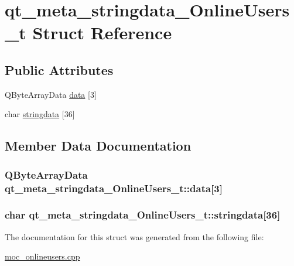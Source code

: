 \hypertarget{structqt__meta__stringdata__OnlineUsers__t}{\section{qt\-\_\-meta\-\_\-stringdata\-\_\-\-Online\-Users\-\_\-t Struct Reference}
\label{structqt__meta__stringdata__OnlineUsers__t}
}
\subsection*{Public Attributes}
\begin{DoxyCompactItemize}
\item 
Q\-Byte\-Array\-Data \hyperlink{structqt__meta__stringdata__OnlineUsers__t_a75c3ca3008c2c89b9b3f04904a9d1a8b}{data} \mbox{[}3\mbox{]}
\item 
char \hyperlink{structqt__meta__stringdata__OnlineUsers__t_aaf55f6ce0afb548da929a429678bcec9}{stringdata} \mbox{[}36\mbox{]}
\end{DoxyCompactItemize}


\subsection{Member Data Documentation}
\hypertarget{structqt__meta__stringdata__OnlineUsers__t_a75c3ca3008c2c89b9b3f04904a9d1a8b}{
\subsubsection[{data}]{\setlength{\rightskip}{0pt plus 5cm}Q\-Byte\-Array\-Data qt\-\_\-meta\-\_\-stringdata\-\_\-\-Online\-Users\-\_\-t\-::data\mbox{[}3\mbox{]}}}\label{structqt__meta__stringdata__OnlineUsers__t_a75c3ca3008c2c89b9b3f04904a9d1a8b}
\hypertarget{structqt__meta__stringdata__OnlineUsers__t_aaf55f6ce0afb548da929a429678bcec9}{
\subsubsection[{stringdata}]{\setlength{\rightskip}{0pt plus 5cm}char qt\-\_\-meta\-\_\-stringdata\-\_\-\-Online\-Users\-\_\-t\-::stringdata\mbox{[}36\mbox{]}}}\label{structqt__meta__stringdata__OnlineUsers__t_aaf55f6ce0afb548da929a429678bcec9}


The documentation for this struct was generated from the following file\-:\begin{DoxyCompactItemize}
\item 
\hyperlink{moc__onlineusers_8cpp}{moc\-\_\-onlineusers.\-cpp}\end{DoxyCompactItemize}
